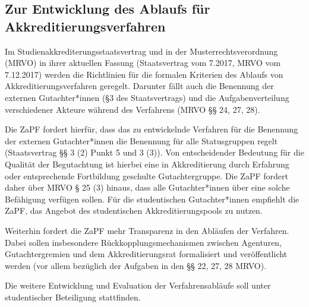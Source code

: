 
\subsection*{Zur Entwicklung des Ablaufs für Akkreditierungsverfahren}
Im Studienakkrediterungsstaatsvertrag und in der Musterrechtsverordnung (MRVO) in ihrer aktuellen Fassung (Staatsvertrag vom 7.2017, MRVO vom 7.12.2017) werden die Richtlinien für die formalen Kriterien des Ablaufs von Akkreditierungsverfahren geregelt. Darunter fällt auch die Benennung der externen Gutachter*innen (§3 des Staatsvertrags) und die Aufgabenverteilung verschiedener Akteure während des Verfahrens (MRVO §§ 24, 27, 28).

Die ZaPF fordert hierfür, dass das zu entwickelnde Verfahren für die Benennung der externen Gutachter*innen die Benennung für alle Statusgruppen regelt (Staatsvertrag §§ 3 (2) Punkt 5 und 3 (3)). Von entscheidender Bedeutung für die Qualität der Begutachtung ist hierbei eine in Akkreditierung durch Erfahrung oder entsprechende Fortbildung geschulte Gutachtergruppe. Die ZaPF fordert daher über MRVO § 25 (3) hinaus, dass alle Gutachter*innen über eine solche Befähigung verfügen sollen. Für die studentischen Gutachter*innen empfiehlt die ZaPF, das Angebot des studentischen Akkreditierungspools zu nutzen.

Weiterhin fordert die ZaPF mehr Transparenz in den Abläufen der Verfahren. Dabei sollen insbesondere Rückkopplungsmechanismen zwischen Agenturen, Gutachtergremien und dem Akkreditierungsrat formalisiert und veröffentlicht werden (vor allem bezüglich der Aufgaben in den §§ 22, 27, 28 MRVO).

Die weitere
Entwicklung und Evaluation der Verfahrensabläufe soll unter studentischer Beteiligung stattfinden.
